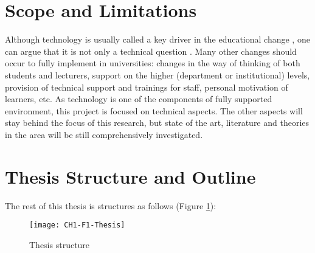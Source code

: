 \section{Scope and Limitations}

Although technology is usually called a key driver in the educational change
\citep{Attwell2007}, one can argue that it is not only a technical question
\citep{Schaffert2008}. Many other changes should occur to fully implement \LLLs
in universities: changes in the way of thinking of both students and lecturers,
support on the higher (department or institutional) levels, provision of
technical support and trainings for staff, personal motivation of learners, etc.
As technology is one of the components of fully supported \LLLs environment,
this project is focused on technical aspects. The other aspects will stay behind
the focus of this research, but state of the art, literature and theories in the
area will be still comprehensively investigated.

\section{Thesis Structure and Outline}

The rest of this thesis is structures as follows (Figure \ref{fig:ts}):

\begin{figure}[htb]
\centering
\texttt{[image: CH1-F1-Thesis]}
\caption{Thesis structure}
\label{fig:ts}
\end{figure}

